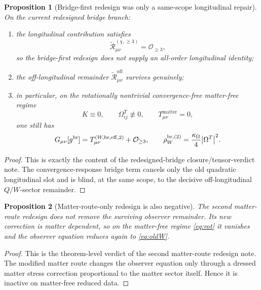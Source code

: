 \documentclass[11pt]{article}
\newcommand{\ReBridge}{g^{\mathrm{br}}}
\newcommand{\ReLong}{\widetilde{\mathcal R}_{\mu\nu}^{(\chi,\ge 3)}}
\newcommand{\ReOff}{\widetilde{\mathcal R}_{\mu\nu}^{\mathrm{off}}}
\newtheorem{proposition}{Proposition}
\begin{document}
\begin{proposition}[Bridge-first redesign was only a same-scope longitudinal repair]
\label{prop:bridgefail}
On the current redesigned bridge branch:
\begin{enumerate}
    \item the longitudinal contribution satisfies
    \begin{equation}
    \ReLong=\mathcal O_{\ge 3},
    \label{eq:long}
    \end{equation}
    so the bridge-first redesign does not supply an all-order longitudinal identity;
    \item the off-longitudinal remainder \(\ReOff\) survives genuinely;
    \item in particular, on the rotationally nontrivial convergence-free matter-free regime
    \begin{equation}
    K\equiv 0,
    \qquad
    \Omega_{ij}^T\not\equiv 0,
    \qquad
    T_{\mu\nu}^{\mathrm{matter}}=0,
    \label{eq:rot}
    \end{equation}
    one still has
    \begin{equation}
    G_{\mu\nu}[\ReBridge]
    =
    T_{\mu\nu}^{(W,\mathrm{br,eff},2)}
    +\mathcal O_{\ge 3},
    \qquad
    \rho_W^{\mathrm{br},(2)}
    =
    \frac{\kappa_\Omega}{4}\abs{\Omega^T}^2.
    \label{eq:oldW}
    \end{equation}
\end{enumerate}
\end{proposition}

\begin{proof}
This is exactly the content of the redesigned-bridge closure/tensor-verdict note. The convergence-response bridge term cancels only the old quadratic longitudinal slot and is blind, at the same scope, to the decisive off-longitudinal \(Q/W\)-sector remainder.
\end{proof}

\begin{proposition}[Matter-route-only redesign is also negative]
\label{prop:matterfail}
The second matter-route redesign does not remove the surviving observer remainder. Its new correction is matter dependent, so on the matter-free regime \eqref{eq:rot} it vanishes and the observer equation reduces again to \eqref{eq:oldW}.
\end{proposition}

\begin{proof}
This is the theorem-level verdict of the second matter-route redesign note. The modified matter route changes the observer equation only through a dressed matter stress correction proportional to the matter sector itself. Hence it is inactive on matter-free reduced data.
\end{proof}
\end{document}
